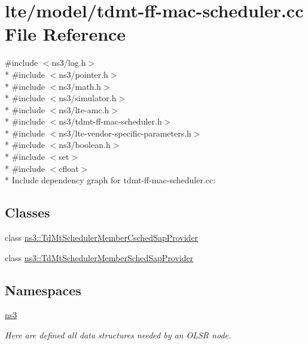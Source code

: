 \hypertarget{lte_2model_2tdmt-ff-mac-scheduler_8cc}{}\section{lte/model/tdmt-\/ff-\/mac-\/scheduler.cc File Reference}
\label{lte_2model_2tdmt-ff-mac-scheduler_8cc}
{\ttfamily \#include $<$ns3/log.\+h$>$}\\*
{\ttfamily \#include $<$ns3/pointer.\+h$>$}\\*
{\ttfamily \#include $<$ns3/math.\+h$>$}\\*
{\ttfamily \#include $<$ns3/simulator.\+h$>$}\\*
{\ttfamily \#include $<$ns3/lte-\/amc.\+h$>$}\\*
{\ttfamily \#include $<$ns3/tdmt-\/ff-\/mac-\/scheduler.\+h$>$}\\*
{\ttfamily \#include $<$ns3/lte-\/vendor-\/specific-\/parameters.\+h$>$}\\*
{\ttfamily \#include $<$ns3/boolean.\+h$>$}\\*
{\ttfamily \#include $<$set$>$}\\*
{\ttfamily \#include $<$cfloat$>$}\\*
Include dependency graph for tdmt-\/ff-\/mac-\/scheduler.cc\+:
\subsection*{Classes}
\begin{DoxyCompactItemize}
\item 
class \hyperlink{classns3_1_1TdMtSchedulerMemberCschedSapProvider}{ns3\+::\+Td\+Mt\+Scheduler\+Member\+Csched\+Sap\+Provider}
\item 
class \hyperlink{classns3_1_1TdMtSchedulerMemberSchedSapProvider}{ns3\+::\+Td\+Mt\+Scheduler\+Member\+Sched\+Sap\+Provider}
\end{DoxyCompactItemize}
\subsection*{Namespaces}
\begin{DoxyCompactItemize}
\item 
 \hyperlink{namespacens3}{ns3}
\begin{DoxyCompactList}\small\item\em Here are defined all data structures needed by an O\+L\+SR node. \end{DoxyCompactList}\end{DoxyCompactItemize}
